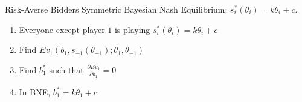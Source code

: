 \documentclass[8pt]{extarticle}
\begin{document}
  \begin{problem}{Risk-Averse Bidders}
    Symmetric Bayesian Nash Equilibrium: $s_i^{\ast}(\theta_i) = k\theta_i + c$.
    \begin{enumerate}[(1)]
      \item Everyone except player $1$ is playing $s_i^{\ast}(\theta_i) = k\theta_i + c$
      \item Find $Ev_{1}(b_1,s_{-1}(\theta_{-1});\theta_1,\theta_{-1})$
      \item Find $b_1^{\ast}$ such that $\frac{\partial Ev_1}{\partial b_1} = 0$
      \item In BNE, $b_1^{\ast} = k\theta_1 + c$
    \end{enumerate}
  \end{problem}
\end{document}
